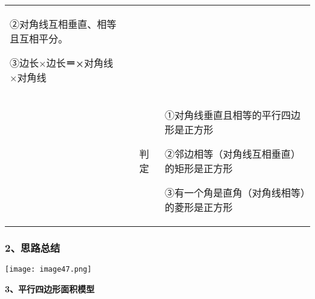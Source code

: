 \begin{longtable}[]{@{}llll@{}}
\begin{minipage}[t]{0.22\columnwidth}
②对角线互相垂直、相等且互相平分。

③边长×边长\textbf{＝×}对角线×对角线\strut
\end{minipage}\tabularnewline
\begin{minipage}[t]{0.22\columnwidth}\raggedright
\strut
\end{minipage} & \begin{minipage}[t]{0.22\columnwidth}\raggedright
\strut
\end{minipage} & \begin{minipage}[t]{0.22\columnwidth}\raggedright
判定\strut
\end{minipage} & \begin{minipage}[t]{0.22\columnwidth}\raggedright
①对角线垂直且相等的平行四边形是正方形

②邻边相等（对角线互相垂直）的矩形是正方形

③有一个角是直角（对角线相等）的菱形是正方形\strut
\end{minipage}\tabularnewline
\bottomrule
\end{longtable}

\hypertarget{ux601dux8defux603bux7ed3}{%
\subsubsection{\texorpdfstring{\textbf{2、思路总结}}{2、思路总结}}\label{ux601dux8defux603bux7ed3}}

\texttt{[image: image47.png]}

\textbf{3、平行四边形面积模型}

